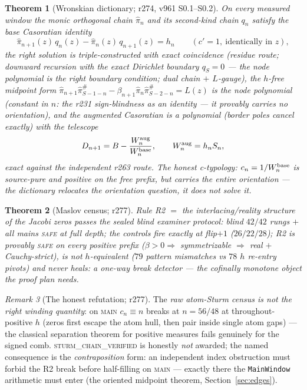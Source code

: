 \documentclass[11pt]{article}
\newtheorem{theorem}{Theorem}[section]
\theoremstyle{definition}
\theoremstyle{remark}
\newtheorem{remark}[theorem]{Remark}
\begin{document}
\begin{theorem}[Wronskian dictionary; r274, v961 S0.1--S0.2]\label{thm:wronskian}
On every measured window the monic orthogonal chain $\hat\pi_n$ and its
second-kind chain $q_n$ satisfy the base Casoratian identity
\[
\hat\pi_{n+1}(z)\,q_n(z)-\hat\pi_n(z)\,q_{n+1}(z)=h_n
\qquad(c'=1,\ \text{identically in }z),
\]
the right solution is triple-constructed with exact coincidence (residue
route; downward recursion with the exact Dirichlet boundary $q_S=0$ ---
\emph{the node polynomial is the right boundary condition}; dual chain
$+$ $L$-gauge), the $h$-free midpoint form
$\hat\pi_{n+1}\hat\pi^{\#}_{S-1-n}-\beta_{n+1}\hat\pi_n\hat\pi^{\#}_{S-2-n}
=L(z)$ \emph{is} the node polynomial (constant in $n$: the r231
sign-blindness as an identity --- it provably carries no orientation),
and the augmented Casoratian is a polynomial (border poles cancel
exactly) with the telescope
\[
D_{n+1}=B-\frac{W^{\rm aug}_n}{W^{\rm base}_n},\qquad
W^{\rm aug}_n=h_nS_n ,
\]
exact against the independent r263 route.  The honest c-typology:
$c_n=1/W^{\rm base}_n$ is source-pure and positive on the free prefix,
but carries the \emph{entire} orientation --- the dictionary relocates
the orientation question, it does not solve it.
\end{theorem}

\begin{theorem}[Maslov census; r277]\label{thm:maslov}
Rule R2 $=$ the interlacing/reality structure of the Jacobi zeros passes
the sealed blind examiner protocol: blind $42/42$ rungs $+$ all mains
\textsc{safe} at full depth; the controls fire \emph{exactly} at
flip$+1$ ($26/22/28$); R2 is provably \textsc{safe} on every positive
prefix ($\beta>0\Rightarrow$ symmetrizable $\Rightarrow$ real $+$
Cauchy-strict), is \emph{not} $h$-equivalent ($79$ pattern mismatches vs
$78$ $h$ re-entry pivots) and never heals: a one-way break detector ---
the cofinally monotone object the proof plan needs.
\end{theorem}

\begin{remark}[The honest refutation; r277]
The \emph{raw atom-Sturm census is not the right winding quantity}: on
\textsc{main} $c_n\equiv n$ breaks at $n=56/48$ at throughout-positive
$h$ (zeros first escape the atom hull, then pair inside single atom
gaps) --- the classical separation theorem for positive measures fails
genuinely for the signed comb.  \textsc{sturm\_chain\_verified} is
honestly \emph{not} awarded; the named consequence is the
\emph{contraposition} form: an independent index obstruction must forbid
the R2 break before half-filling on \textsc{main} --- exactly there the
\texttt{MainWindow} arithmetic must enter (the oriented midpoint theorem,
Section~\ref{sec:edges}).
\end{remark}
\end{document}
